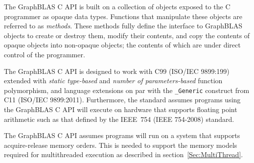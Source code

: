 \documentclass[11pt]{extbook}
\begin{document}
The GraphBLAS C API is built on a collection of   
objects exposed to the C programmer as opaque data types. 
Functions that manipulate these objects are referred to as 
{\it methods}.  These methods fully define the 
interface to GraphBLAS objects to create or destroy them, modify their 
contents, and copy the contents of opaque objects into non-opaque objects; the 
contents of which are under direct control of the programmer.

The GraphBLAS C API is designed to work with C99 (ISO/IEC 9899:199) 
extended with {\it static type-based} and {\it number of parameters-based}
function polymorphism, and language extensions on par with 
the {\tt \_Generic} construct from C11 (ISO/IEC 9899:2011).  
Furthermore, the standard assumes programs using the GraphBLAS C API
will execute on hardware that supports floating point arithmetic
such as that defined by the IEEE~754 (IEEE 754-2008) standard. 

The GraphBLAS C API assumes programs will run on a system
that supports acquire-release memory orders.  This is needed to support
the memory models required for multithreaded execution as described in section~\ref{Sec:MultiThread}.

\end{document}
